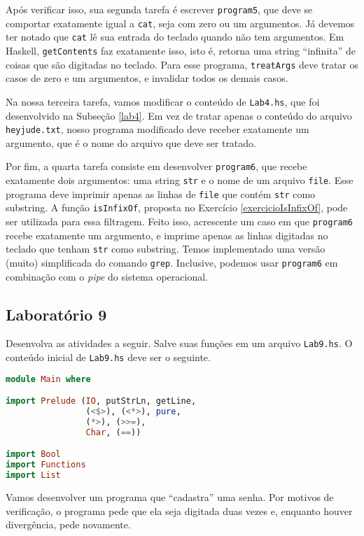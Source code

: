 \documentclass[a4paper]{article}
\begin{document}
Após verificar isso, sua segunda tarefa é escrever \texttt{program5}, que deve se comportar exatamente igual a \texttt{cat}, seja com zero ou um argumentos.
Já devemos ter notado que \texttt{cat} lê sua entrada do teclado quando não tem argumentos.
Em Haskell, \texttt{getContents} faz exatamente isso, isto é, retorna uma string ``infinita'' de coisas que são digitadas no teclado.
Para esse programa, \texttt{treatArgs} deve tratar os casos de zero e um argumentos, e invalidar todos os demais casos.

Na nossa terceira tarefa, vamos modificar o conteúdo de \texttt{Lab4.hs}, que foi desenvolvido na Subseção \ref{lab4}.
Em vez de tratar apenas o conteúdo do arquivo \texttt{heyjude.txt}, nosso programa modificado deve receber exatamente um argumento, que é o nome do arquivo que deve ser tratado.

Por fim, a quarta tarefa consiste em desenvolver \texttt{program6}, que recebe exatamente dois argumentos: uma string \texttt{str} e o nome de um arquivo \texttt{file}.
Esse programa deve imprimir apenas as linhas de \texttt{file} que contém \texttt{str} como substring.
A função \texttt{isInfixOf}, proposta no Exercício \ref{exercicioIsInfixOf}, pode ser utilizada para essa filtragem.
Feito isso, acrescente um caso em que \texttt{program6} recebe exatamente um argumento, e imprime apenas as linhas digitadas no teclado que tenham \texttt{str} como substring.
Temos implementado uma versão (muito) simplificada do comando \texttt{grep}.
Inclusive, podemos usar \texttt{program6} em combinação com o \emph{pipe} do sistema operacional.

\subsection{Laboratório 9}

Desenvolva as atividades a seguir.
Salve suas funções em um arquivo \texttt{Lab9.hs}.
O conteúdo inicial de \texttt{Lab9.hs} deve ser o seguinte.

\begin{lstlisting}[language=haskell, frame=single]
module Main where

import Prelude (IO, putStrLn, getLine,
                (<$>), (<*>), pure,
                (*>), (>>=),
                Char, (==))

import Bool
import Functions
import List
\end{lstlisting}

Vamos desenvolver um programa que ``cadastra'' uma senha.
Por motivos de verificação, o programa pede que ela seja digitada duas vezes e, enquanto houver divergência, pede novamente.
\end{document}
